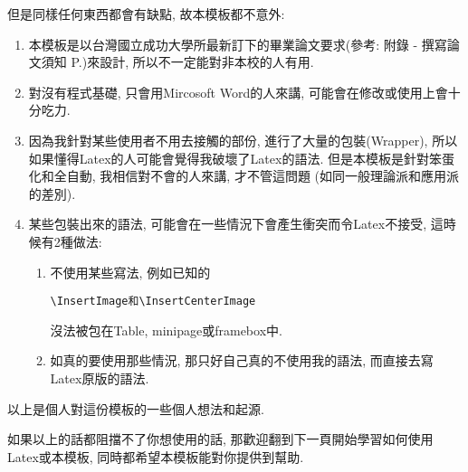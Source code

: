 但是同樣任何東西都會有缺點, 故本模板都不意外:

\begin{enumerate}

  \item
  {
    本模板是以台灣國立成功大學所最新訂下的畢業論文要求(參考: 附錄 - 撰寫論文須知 P.)來設計, 所以不一定能對非本校的人有用.
  } %

  \item
  {
    對沒有程式基礎, 只會用Mircosoft Word的人來講, 可能會在修改或使用上會十分吃力.
  } %

  \item
  {
    因為我針對某些使用者不用去接觸的部份, 進行了大量的包裝(Wrapper), 所以如果懂得Latex的人可能會覺得我破壞了Latex的語法. 但是本模板是針對笨蛋化和全自動, 我相信對不會的人來講, 才不管這問題 (如同一般理論派和應用派的差別).
  } %

  \item
  {
    某些包裝出來的語法, 可能會在一些情況下會產生衝突而令Latex不接受, 這時候有2種做法:
    \begin{enumerate}
      \item
      {
        不使用某些寫法, 例如已知的\begin{verbatim}\InsertImage和\InsertCenterImage\end{verbatim}沒法被包在Table, minipage或framebox中.
      } %

      \item
      {
        如真的要使用那些情況, 那只好自己真的不使用我的語法, 而直接去寫Latex原版的語法.
      } %
    \end{enumerate}
  } %
\end{enumerate}



以上是個人對這份模板的一些個人想法和起源.

如果以上的話都阻擋不了你想使用的話, 那歡迎翻到下一頁開始學習如何使用Latex或本模板, 同時都希望本模板能對你提供到幫助.

\EndChapter
